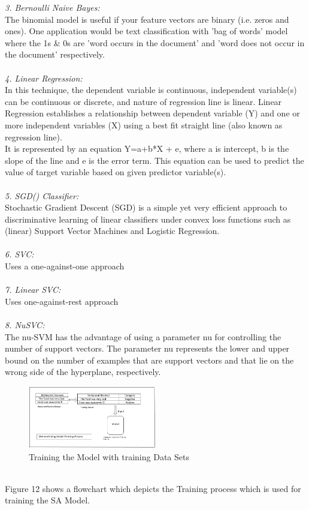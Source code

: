 \documentclass[conference]{IEEEtran}
\begin{document}
\textit{3. Bernoulli Naive Bayes: }\\
The binomial model is useful if your feature vectors are binary (i.e. zeros and ones). One application would be text classification with 'bag of words' model where the 1s \& 0s are 'word occurs in the document' and 'word does not occur in the document' respectively.\\\\
\textit{4. Linear Regression:} \\
In this technique, the dependent variable is continuous, independent variable(s) can be continuous or discrete, and nature of regression line is linear. Linear Regression establishes a relationship between dependent variable (Y) and one or more independent variables (X) using a best fit straight line (also known as regression line).\\
It is represented by an equation Y=a+b*X + e, where a is intercept, b is the slope of the line and e is the error term. This equation can be used to predict the value of target variable based on given predictor variable(s).\\\\
\textit{5. SGD() Classifier: }\\
Stochastic Gradient Descent (SGD) is a simple yet very efficient approach to discriminative learning of linear classifiers under convex loss functions such as (linear) Support Vector Machines and Logistic Regression.\\\\
\textit{6. SVC:} \\
Uses a one-against-one approach\\\\
\textit{7. Linear SVC: }\\
Uses one-against-rest approach\\\\
\textit{8. NuSVC:} \\
The nu-SVM has the advantage of using a parameter nu for controlling the number of support vectors. The parameter nu represents the lower and upper bound on the number of examples that are support vectors and that lie on the wrong side of the hyperplane, respectively. 
\begin{figure}[!ht]
	\centering
	\includegraphics[width=0.5\textwidth]{train.png}
	\caption{Training the Model with training Data Sets}
\end{figure}
\\
Figure 12 shows a flowchart which depicts the Training process which is used for training the SA Model.
\end{document}
